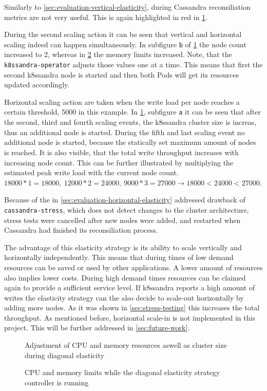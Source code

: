 Similarly to \cref{sec:evaluation-vertical-elasticity}, during Cassandra reconsiliation metrics are not very useful. This is again highlighted in red in \cref{fig:diagonal-elasticity}.

During the second scaling action it can be seen that vertical and horizontal scaling indeed can happen simultaneously. In subfigure \texttt{b} of \cref{fig:diagonal-elasticity} the node count increased to 2, whereas in \cref{fig:diagonal-elasticity-limits} the memory limits increased. Note, that the \texttt{k8ssandra-operator} adjusts those values one at a time. This means that first the second k8ssandra node is started and then both Pods will get its resources updated accordingly.

Horizontal scaling action are taken when the write load per node reaches a certain threshold, 5000 in this example. In \cref{fig:diagonal-elasticity}, subfigure \texttt{a} it can be seen that after the second, third and fourth scaling events, the k8ssandra cluster size is increas, thus an additional node is started. During the fifth and last scaling event no additional node is started, because the statically set maximum amount of nodes is reached. It is also visible, that the total write throughput increases with increasing node count. This can be further illustrated by multiplying the estimated peak write load with the current node count. \(18000 * 1 = 18000,\ 12000 * 2 = 24000,\ 9000 * 3 = 27000 \rightarrow 18000 < 24000 < 27000\).

Because of the in \cref{sec:evaluation-horizontal-elasticity} addressed drawback of \texttt{cassandra-stress}, which does not detect changes to the cluster architecture, stress tests were cancelled after new nodes were added, and restarted when Cassandra had finished its reconsiliation process.

The advantage of this elasticity strategy is its ability to scale vertically and horizontally independently. This means that during times of low demand resources can be saved or used by other applications. A lower amount of resources also implies lower costs. During high demand times resources can be claimed again to provide a sufficient service level. If k8ssandra reports a high amount of writes the elasticity strategy can the also decide to scale-out horizontally by adding more nodes. As it was shown in \cref{sec:stress-testing} this increases the total throughput. As mentioned before, horizontal scale-in is not implemented in this project. This will be further addressed in \cref{sec:future-work}.

\begin{figure}
    \centering
    
    \caption{Adjustment of CPU and memory resources aswell as cluster size during diagonal elasticity}
    \label{fig:diagonal-elasticity}
\end{figure}

\begin{figure}
    \centering
    
    \caption{CPU and memory limits while the diagonal elasticity strategy controller is running}
    \label{fig:diagonal-elasticity-limits}
\end{figure}
